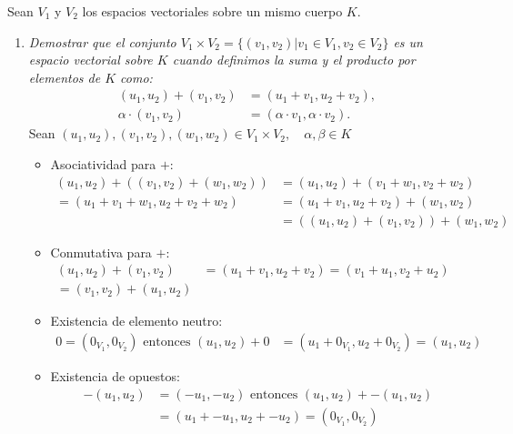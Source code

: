 \begin{ejercicio} Sean $V_1$ y $V_2$ los espacios vectoriales sobre un mismo cuerpo $K$.
	\begin{enumerate}
		\item \textit{Demostrar que el conjunto $V_1 \times V_2 = \{ (v_1,v_2) | v_1 \in V_1, v_2 \in V_2 \}$ es un espacio vectorial sobre $K$ cuando definimos la suma y el producto por elementos de $K$ como:}
		      \begin{align*}
			      (u_1,u_2) + (v_1,v_2)   & = (u_1 + v_1, u_2 + v_2),               \\
			      \alpha \cdot (v_1, v_2) & = (\alpha \cdot v_1, \alpha \cdot v_2).
		      \end{align*}
		      Sean $(u_1,u_2),(v_1,v_2),(w_1,w_2) \in V_1 \times V_2, \quad \alpha,\beta \in K$
		      \begin{itemize}
			      \item Asociatividad para $+$:
			            \begin{align*}
				            (u_1,u_2) + ((v_1,v_2) + (w_1,w_2)) & = (u_1,u_2) + (v_1 + w_1,v_2 + w_2)   \\ = (u_1 + v_1 + w_1,u_2 + v_2 + w_2)
				                                                & = (u_1 + v_1,u_2 + v_2) + (w_1,w_2)   \\
				                                                & = ((u_1,u_2) + (v_1,v_2)) + (w_1,w_2)
			            \end{align*}
			      \item Conmutativa para $+$:
			            \begin{align*}
				            (u_1,u_2) + (v_1,v_2) & = (u_1 + v_1,u_2 + v_2) = (v_1 + u_1,v_2 + u_2) & \\= (v_1,v_2) + (u_1,u_2)
			            \end{align*}
			      \item Existencia de elemento neutro:
			            \begin{align*}
				            0 = (0_{V_1},0_{V_2}) \text{ entonces } (u_1,u_2) + 0 & = (u_1 + 0_{V_1},u_2 + 0_{V_2}) = (u_1,u_2)
			            \end{align*}
			      \item Existencia de opuestos:
			            \begin{align*}
				            -(u_1,u_2) & = (-u_1,-u_2) \text{ entonces } (u_1,u_2) + -(u_1,u_2) \\&= (u_1 + -u_1,u_2 + -u_2) = (0_{V_1},0_{V_2})
			            \end{align*}

\end{itemize}
\end{enumerate}
\end{ejercicio}
